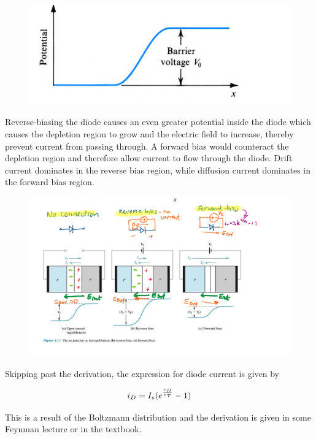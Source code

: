 \documentclass[../notes.tex]{subfiles}
\begin{document}
\begin{figure}[H]
	\centering
	\includegraphics[width=0.8\linewidth]{img/image_2022-10-19-20-11-10.png}
\end{figure}


Reverse-biasing the diode causes an even greater potential inside the diode which causes the depletion region to grow and the electric field to increase, thereby prevent current from passing through.
A forward bias would counteract the depletion region and therefore allow current to flow through the diode.
Drift current dominates in the reverse bias region, while diffusion current dominates in the forward bias region.

\begin{figure}[H]
	\centering
	\includegraphics[width=0.8\linewidth]{img/image_2022-10-19-20-12-51.png}
\end{figure}

Skipping past the derivation, the expression for diode current is given by


\begin{equation}
	i_D = I_s (e^{v_D \over v_T} - 1)
\end{equation}


This is a result of the Boltzmann distribution and the derivation is given in some Feynman lecture or in the textbook.
\end{document}
